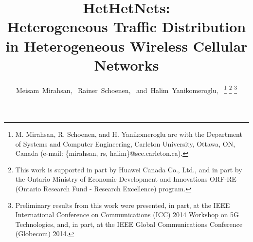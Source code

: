 \documentclass[journal]{IEEEtran}
\begin{document}
\fnbelowfloat
\newtheorem{definition}{Definition}
\newtheorem{lemma}{\textit{ ~Lemma}}













\title{HetHetNets:\\ Heterogeneous Traffic Distribution in Heterogeneous Wireless Cellular Networks}

\author{Meisam~Mirahsan,~
        Rainer~Schoenen,~
        and~Halim~Yanikomeroglu,~
\thanks{M. Mirahsan, R. Schoenen, and H. Yanikomeroglu are with the Department of Systems and Computer Engineering, Carleton University, Ottawa, ON, Canada (e-mail: \{mirahsan, rs, halim\}@sce.carleton.ca).}
\thanks{This work is supported in part by Huawei Canada Co., Ltd., and in part by the Ontario Ministry of Economic Development and Innovations ORF-RE (Ontario Research Fund - Research Excellence) program.}
\thanks{Preliminary results from this work were presented, in part, at the IEEE International Conference on Communications (ICC) 2014 Workshop on 5G Technologies, and, in part, at the IEEE Global Communications Conference (Globecom) 2014.}}
\maketitle
\end{document}
